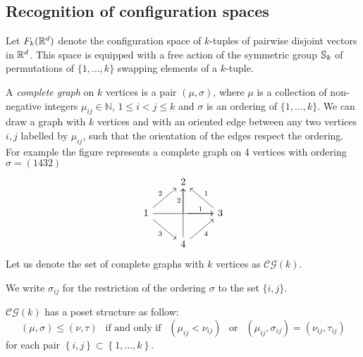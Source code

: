 \subsection{Recognition of configuration spaces}

Let $F_k(\mathbb{R}^{d})$ denote the configuration space of $k$-tuples of pairwise disjoint vectors in $\mathbb{R}^{d}$.
This space is equipped with a free action of the symmetric group $\mathbb{S}_k$ of permutations of $\{1,\dots,k\}$ swapping elements of a $k$-tuple.


\begin{definition}
	A \textit{complete graph} on $k$ vertices is
	a pair $(\mu,\sigma)$, where $\mu$ is a collection of non-negative integers $\mu_{ij}\in\mathbb{N}$, $1 \leq i < j \leq k$
	and $\sigma$ is an ordering of
	$\{1,\dots,k\}$.
	We can draw a graph with $k$ vertices and with an oriented edge between any two vertices $i,j$
	labelled by $\mu_{ij}$, such that the orientation of the edges respect the ordering.
	For example the figure represents a complete graph on 4 vertices with ordering $\sigma=(1432)$
	\begin{equation*}
		\begin{tikzcd}
			\ & 2 & \  \\
			1 \arrow[ur,"2"] \arrow[rr] \arrow[dr,"3"']& \arrow[r,"1"] \arrow[u,"2"] & 3 \arrow[ul,"1"']  \\
			\ & 4 \arrow[ur,"4"'] \arrow[uu] & \
		\end{tikzcd}
	\end{equation*}
	Let us denote the set of complete graphs with $k$ vertices as $\mathcal{CG}(k)$.

	We write $\sigma_{ij}$ for the restriction of the ordering $\sigma$ to the set $\{i,j\}$.
\end{definition}

\begin{definition}
	$\mathcal{CG}(k)$ has a poset structure as follow:
	\begin{equation*}
		(\mu,\sigma)\le (\nu,\tau) \ \ \text{ if and only if } \ \ (\mu_{ij}<\nu_{ij}) \ \ \text{ or } \ \ (\mu_{ij},\sigma_{ij})= (\nu_{ij},\tau_{ij})
	\end{equation*}
	for each pair $\left\lbrace i,j\right\rbrace \subset\left\lbrace 1,\dots,k  \right\rbrace $.
\end{definition}

